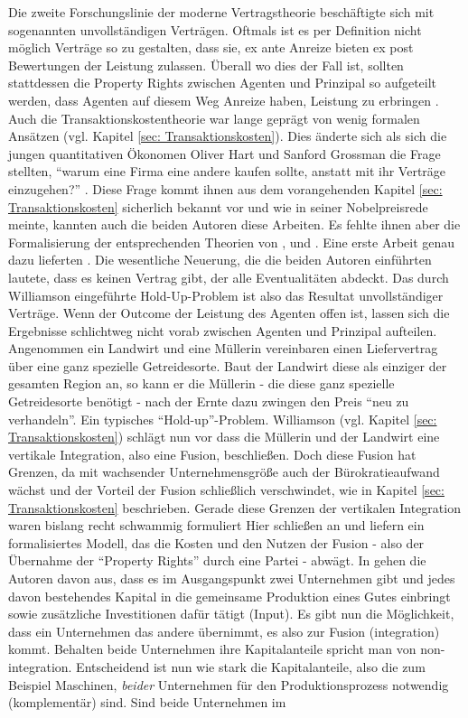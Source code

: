 Die zweite Forschungslinie der moderne Vertragstheorie beschäftigte sich mit sogenannten unvollständigen Verträgen. Oftmals ist es per Definition nicht möglich Verträge so zu gestalten, dass sie, ex ante Anreize bieten ex post Bewertungen der Leistung zulassen. Überall wo dies der Fall ist, sollten stattdessen die Property Rights zwischen Agenten und Prinzipal so aufgeteilt werden, dass Agenten auf diesem Weg Anreize haben, Leistung zu erbringen \parencite[S. 2]{Nobelpreis-Komitee2016}. Auch die Transaktionskostentheorie war lange geprägt von wenig formalen Ansätzen (vgl. Kapitel \ref{sec: Transaktionskosten}). Dies änderte sich als sich die jungen quantitativen Ökonomen Oliver Hart und Sanford Grossman die Frage stellten, "`warum eine Firma eine andere kaufen sollte, anstatt mit ihr Verträge einzugehen?"' \parencite[S. 372]{Hart2016}. Diese Frage kommt ihnen aus dem vorangehenden Kapitel \ref{sec: Transaktionskosten} sicherlich bekannt vor und wie \textcite[S. 372]{Hart2016} in seiner Nobelpreisrede meinte, kannten auch die beiden Autoren diese Arbeiten. Es fehlte ihnen aber die Formalisierung der entsprechenden Theorien von \textcite{Coase1937}, \textcite{Williamson1975} und \textcite{Klein1978}. Eine erste Arbeit genau dazu lieferten \textcite{Hart1986}. Die wesentliche Neuerung, die die beiden Autoren einführten lautete, dass es keinen Vertrag gibt, der alle Eventualitäten abdeckt. Das durch Williamson eingeführte Hold-Up-Problem ist also das Resultat unvollständiger Verträge. Wenn der Outcome der Leistung des Agenten offen ist, lassen sich die Ergebnisse schlichtweg nicht vorab zwischen Agenten und Prinzipal aufteilen. Angenommen ein Landwirt und eine Müllerin vereinbaren einen Liefervertrag über eine ganz spezielle Getreidesorte. Baut der Landwirt diese als einziger der gesamten Region an, so kann er die Müllerin - die diese ganz spezielle Getreidesorte benötigt - nach der Ernte dazu zwingen den Preis "`neu zu verhandeln"'. Ein typisches "`Hold-up"'-Problem. Williamson (vgl. Kapitel \ref{sec: Transaktionskosten}) schlägt nun vor dass die Müllerin und der Landwirt eine vertikale Integration, also eine Fusion, beschließen. Doch diese Fusion hat Grenzen, da mit wachsender Unternehmensgröße auch der Bürokratieaufwand wächst und der Vorteil der Fusion schließlich verschwindet, wie in Kapitel \ref{sec: Transaktionskosten} beschrieben. Gerade diese Grenzen der vertikalen Integration waren bislang recht schwammig formuliert \parencite[S. 19]{Nobelpreis-Komitee2016} Hier schließen \textcite{Hart1986} an und liefern ein formalisiertes Modell, das die Kosten und den Nutzen der Fusion - also der Übernahme der "`Property Rights"' durch eine Partei - abwägt. In \textcite{Hart1986} gehen die Autoren davon aus, dass es im Ausgangspunkt zwei Unternehmen gibt und jedes davon bestehendes Kapital in die gemeinsame Produktion eines Gutes einbringt sowie zusätzliche Investitionen dafür tätigt (Input). Es gibt nun die Möglichkeit, dass ein Unternehmen das andere übernimmt, es also zur Fusion (integration) kommt. Behalten beide Unternehmen ihre Kapitalanteile spricht man von non-integration. Entscheidend ist nun wie stark die Kapitalanteile, also die zum Beispiel Maschinen, \textit{beider} Unternehmen für den Produktionsprozess notwendig (komplementär) sind. Sind beide Unternehmen im 